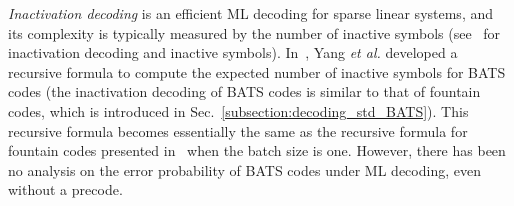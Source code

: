 \textit{Inactivation decoding} is an efficient ML decoding for sparse linear systems, and its complexity is typically measured by the number of inactive symbols (see~\cite{InactivationPatent,Raptor_codes_foundations_and_trends,Lazaro2017inactivation} for inactivation decoding and inactive symbols). In~\cite{FL_analysis_BATS}, Yang \textit{et al.} developed a recursive formula to compute the expected number of inactive symbols for BATS codes (the inactivation decoding of BATS codes is similar to that of fountain codes, which is introduced in Sec.~\ref{subsection:decoding_std_BATS}). This recursive formula becomes essentially the same as the recursive formula for fountain codes presented in~\cite{Lazaro2017inactivation} when the batch size is one. However, there has been no analysis on the error probability of BATS codes under ML decoding, even without a precode.